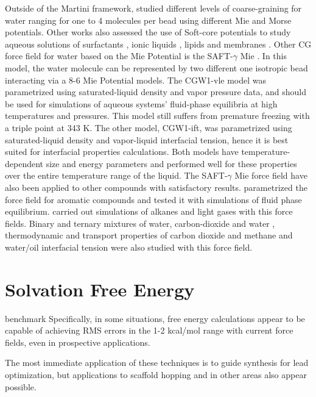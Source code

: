 Outside of the Martini framework,  studied different levels of coarse-graining for water ranging for one to 4 molecules per bead using different Mie and Morse potentials. Other works also assessed the use of Soft-core potentials to study aqueous solutions of surfactants \cite{shinoda2007}, ionic liquids \cite{bhargava2009}, lipids \cite{shinoda20102} and membranes \cite{pantano2009}. Other CG force field for water based on the Mie Potential is the SAFT-$\gamma$ Mie \cite{lobanova2015}. In this model, the water molecule can be represented by two different one isotropic bead interacting via a 8-6 Mie Potential models. The CGW1-vle model was parametrized using saturated-liquid density and vapor pressure data, and should be used for simulations of aqueous systems' fluid-phase equilibria at high temperatures and pressures. This model still suffers from premature freezing with a triple point at 343 K. The other model, CGW1-ift, was parametrized using saturated-liquid density and vapor-liquid interfacial tension, hence it is best suited for interfacial properties calculations. Both models have temperature-dependent size and energy parameters and performed well for these properties over the entire temperature range of the liquid. The SAFT-$\gamma$ Mie force field have also been applied to other compounds with satisfactory results.  parametrized the force field for aromatic compounds and tested it with simulations of fluid phase equilibrium.  carried out simulations of alkanes and light gases with this force fields. Binary and ternary mixtures of water, carbon-dioxide and water \cite{lobanova2016}, thermodynamic and transport properties of carbon dioxide and methane \cite{cassiano1,cassiano2} and water/oil interfacial tension \cite{herdes2017} were also studied with this force field.   

\section{Solvation Free Energy}

benchmark
Specifically, in some
situations, free energy calculations appear to be capable
of achieving RMS errors in the 1-2 kcal/mol range with
current force fields, even in prospective applications.

The most immediate application of these techniques is to guide synthesis for lead optimization, but applications to scaffold
hopping and in other areas also appear possible.

